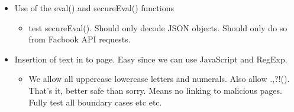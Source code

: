     \begin{itemize}
    
    \item Use of the eval() and secureEval() functions
    \begin{itemize}
        \item test secureEval(). Should only decode JSON objects. Should only do so from Facbook API requests.
    \end{itemize}
    
    \item Insertion of text in to page. Easy since we can use JavaScript and RegExp.
    \begin{itemize}
        \item We allow all uppercase lowercase letters and numerals. Also allow .,?!(). That's it, better safe than sorry. Means no linking to malicious pages. Fully test all boundary cases etc etc.
    \end{itemize}
    

\end{itemize}
